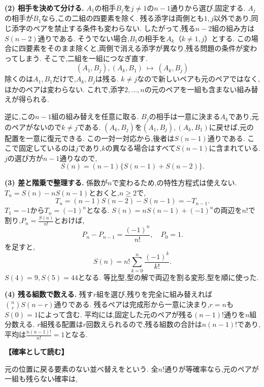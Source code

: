\begin{enumerate}[label=\textbf{問\arabic*.},leftmargin=3.8em,format=\bookitemlink{practice-entrance}{solution}{problem}]
    \par\smallskip\textbf{(2) 相手を決めて分ける.}
    $A_1$の相手$B_j$を$j\ne1$の$n-1$通りから選び,固定する.
    $A_j$の相手が$B_1$なら,この二組の四要素を除く.
    残る添字は両側とも$1,j$以外であり,同じ添字のペアを禁止する条件も変わらない.
    したがって,残る$n-2$組の組み方は$S(n-2)$通りである.
    そうでない場合,$B_1$の相手を$A_k$（$k\ne1,j$）とする.
    この場合に四要素をそのまま除くと,両側で消える添字が異なり,残る問題の条件が変わってしまう.
    そこで,二組を一組につなぎ直す.
    \[
      (A_1,B_j),(A_k,B_1)\ \longmapsto\ (A_k,B_j)
    \]
    除くのは$A_1,B_1$だけで,$A_k,B_j$は残る.
    $k\ne j$なので新しいペアも元のペアではなく,ほかのペアは変わらない.
    これで,添字$2,\ldots,n$の元のペアを一組も含まない組み替えが得られる.
    \par
    逆に,この$n-1$組の組み替えを任意に取る.
    $B_j$の相手は一意に決まる$A_k$であり,元のペアがないので$k\ne j$である.
    $(A_k,B_j)$を$(A_1,B_j),(A_k,B_1)$に戻せば,元の配置を一意に復元できる.
    この一対一対応から,後者は$S(n-1)$通りである.
    ここで固定しているのは$j$であり,$k$の異なる場合はすべて$S(n-1)$に含まれている.
    $j$の選び方が$n-1$通りなので,
    \[
      S(n)=(n-1)\{S(n-1)+S(n-2)\}.
    \]
    \par\smallskip\textbf{(3) 差と階乗で整理する.}
    係数が$n$で変わるため,の特性方程式は使えない.
    $T_n=S(n)-nS(n-1)$とおくと,$n\ge2$で,
    \[
      T_n=(n-1)S(n-2)-S(n-1)=-T_{n-1}.
    \]
    $T_1=-1$から$T_n=(-1)^n$となる.
    $S(n)=nS(n-1)+(-1)^n$の両辺を$n!$で割り,$P_n=\frac{S(n)}{n!}$とおけば,
    \[
      P_n-P_{n-1}=\frac{(-1)^n}{n!},\quad P_0=1.
    \]
    を足すと,
    \[
      S(n)=n!\sum_{k=0}^n\frac{(-1)^k}{k!}.
    \]
    $S(4)=9,S(5)=44$となる.
    等比型,型の解で両辺を割る変形,型を順に使った.
    \par\smallskip\textbf{(4) 残る組数で数える.}
    残す$r$組を選び,残りを完全に組み替えれば$\binom nrS(n-r)$通りである.
    残るペアは完成形から一意に決まり,$r=n$も$S(0)=1$によって含む.
    平均には,固定した元のペアが残る$(n-1)!$通りを$n$組分数える.
    $r$組残る配置は$r$回数えられるので,残る組数の合計は$n(n-1)!$であり,平均は$\frac{n(n-1)!}{n!}=1$となる.
    \par\smallskip\noindent\textbf{【確率として読む】}\par\nopagebreak[4]
    元の位置に戻る要素のない並べ替えを\textbf{}という.
    全$n!$通りが等確率なら,元のペアが一組も残らない確率は,

\end{enumerate}
